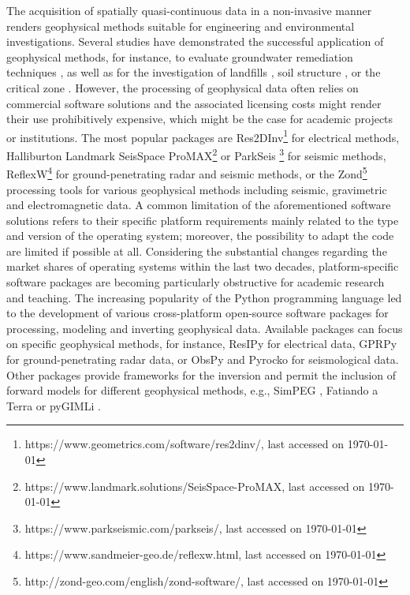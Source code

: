 \documentclass[a4paper,fleqn]{cas-sc}
\begin{document}
The acquisition of spatially quasi-continuous data in a non-invasive manner renders geophysical methods suitable for engineering and environmental investigations. Several studies have demonstrated the successful application of geophysical methods, for instance, to evaluate groundwater remediation techniques \citep[e.g.,][]{floresorozco2015}, as well as for the investigation of landfills \citep[e.g.,][]{nguyen2018, steiner2022}, soil structure \citep[e.g.,][]{romero2019}, or the critical zone \citep[e.g.,][]{parsekian2015}. 
However, the processing of geophysical data often relies on commercial software solutions and the associated licensing costs might render their use prohibitively expensive, which might be the case for academic projects or institutions.
The most popular packages are Res2DInv\footnote{https://www.geometrics.com/software/res2dinv/, last accessed on \today} for electrical methods, Halliburton Landmark SeisSpace ProMAX\footnote{https://www.landmark.solutions/SeisSpace-ProMAX, last accessed on \today} or ParkSeis \footnote{https://www.parkseismic.com/parkseis/, last accessed on \today} for seismic methods, ReflexW\footnote{https://www.sandmeier-geo.de/reflexw.html, last accessed on \today} for ground-penetrating radar and seismic methods, or the Zond\footnote{http://zond-geo.com/english/zond-software/, last accessed on \today} processing tools for various geophysical methods including seismic, gravimetric and electromagnetic data. 
A common limitation of the aforementioned software solutions refers to their specific platform requirements mainly related to the type and version of the operating system; moreover, the possibility to adapt the code are limited if possible at all. Considering the substantial changes regarding the market shares of operating systems within the last two decades, platform-specific software packages are becoming particularly obstructive for academic research and teaching.
The increasing popularity of the Python programming language led to the development of various cross-platform open-source software packages for processing, modeling and inverting geophysical data. Available packages can focus on specific geophysical methods, for instance, ResIPy \citep{blanchy2020} for electrical data, GPRPy \citep{plattner2020} for ground-penetrating radar data, or ObsPy \citep{beyreuther2010} and Pyrocko \citep{heimann2017} for seismological data. Other packages provide frameworks for the inversion and permit the inclusion of forward models for different geophysical methods, e.g., SimPEG \citep{cockett2015}, Fatiando a Terra \citep{uieda2013} or pyGIMLi \citep{ruecker2017}. 
\end{document}
